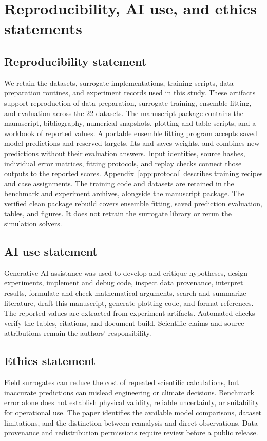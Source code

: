 \section{Reproducibility, AI use, and ethics statements}
\label{app:statements}

\subsection{Reproducibility statement}
We retain the datasets, surrogate implementations, training scripts, data
preparation routines, and experiment records used in this study. These artifacts
support reproduction of data preparation, surrogate training, ensemble fitting,
and evaluation across the 22 datasets. The manuscript package contains the manuscript,
bibliography, numerical snapshots, plotting and table scripts, and a workbook
of reported values. A portable ensemble fitting program accepts saved model
predictions and reserved targets, fits and saves weights, and combines new
predictions without their evaluation answers. Input identities, source hashes,
individual error matrices, fitting protocols, and replay checks connect those
outputs to the reported scores. Appendix~\ref{app:protocol} describes training
recipes and case assignments. The training code and datasets are retained in
the benchmark and experiment archives, alongside the manuscript package.
The verified clean package rebuild covers ensemble fitting, saved prediction
evaluation, tables, and figures. It does not retrain the surrogate library or
rerun the simulation solvers.

\subsection{AI use statement}
Generative AI assistance was used to develop and critique hypotheses, design experiments, implement and debug
code, inspect data provenance, interpret results, formulate and check mathematical arguments, search and summarize
literature, draft this manuscript, generate plotting code, and format references.
The reported values are extracted from experiment artifacts. Automated checks verify the
tables, citations, and document build. Scientific claims and source attributions
remain the authors' responsibility.

\subsection{Ethics statement}
Field surrogates can reduce the cost of repeated scientific calculations, but inaccurate
predictions can mislead engineering or climate decisions. Benchmark error alone does not
establish physical validity, reliable uncertainty, or suitability for operational use.
The paper identifies the available model comparisons, dataset limitations, and
the distinction between reanalysis and direct observations. Data provenance and redistribution
permissions require review before a public release.
